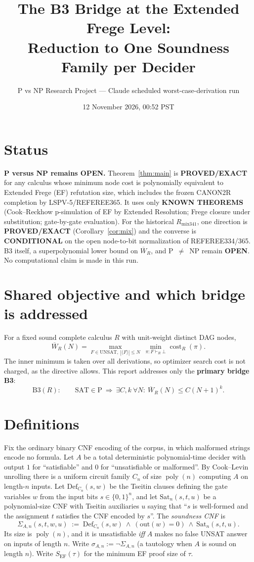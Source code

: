 \documentclass[11pt]{article}
\title{The B3 Bridge at the Extended Frege Level:\\
Reduction to One Soundness Family per Decider}
\author{P vs NP Research Project --- Claude scheduled worst-case-derivation run}
\date{12 November 2026, 00:52 PST}
\newcommand{\SAT}{\mathrm{SAT}}
\newcommand{\UNSAT}{\mathrm{UNSAT}}
\newcommand{\Wbar}{\overline W}
\newcommand{\EF}{\mathrm{EF}}
\newcommand{\poly}{\operatorname{poly}}
\begin{document}
\maketitle

\section*{Status}
\textbf{P versus NP remains OPEN.} Theorem~\ref{thm:main} is
\textbf{PROVED/EXACT} for any calculus whose minimum node cost is polynomially
equivalent to Extended Frege (EF) refutation size, which includes the frozen
CANON2R completion by LSPV-5/REFEREE365. It uses only \textbf{KNOWN THEOREMS}
(Cook--Reckhow p-simulation of EF by Extended Resolution; Frege closure under
substitution; gate-by-gate evaluation). For the historical $R_{\mathrm{mix341}}$,
one direction is \textbf{PROVED/EXACT} (Corollary~\ref{cor:mix}) and the converse is
\textbf{CONDITIONAL} on the open node-to-bit normalization of REFEREE334/365.
B3 itself, a superpolynomial lower bound on $\Wbar_R$, and P~$\neq$~NP remain
\textbf{OPEN}. No computational claim is made in this run.

\section*{Shared objective and which bridge is addressed}
For a fixed sound complete calculus $R$ with unit-weight distinct DAG nodes,
\[
\Wbar_R(N)=\max_{F\in\UNSAT,\ |\langle F\rangle|\le N}\ \min_{\pi:F\vdash_R\bot}\operatorname{cost}_R(\pi).
\]
The inner minimum is taken over all derivations, so optimizer search cost is not
charged, as the directive allows. This report addresses only the
\textbf{primary bridge B3}:
\[
\mathrm{B3}(R):\qquad \SAT\in\mathrm P\ \Longrightarrow\ \exists C,k\ \forall N:\ \Wbar_R(N)\le C(N+1)^k .
\]

\section{Definitions}
Fix the ordinary binary CNF encoding of the corpus, in which malformed strings
encode no formula. Let $A$ be a total deterministic polynomial-time decider with
output $1$ for ``satisfiable'' and $0$ for ``unsatisfiable or malformed''. By
Cook--Levin unrolling there is a uniform circuit family $C_n$ of size $\poly(n)$
computing $A$ on length-$n$ inputs. Let $\mathrm{Def}_{C_n}(s,w)$ be the
Tseitin clauses defining the gate variables $w$ from the input bits
$s\in\{0,1\}^n$, and let $\mathrm{Sat}_n(s,t,u)$ be a polynomial-size CNF with
Tseitin auxiliaries $u$ saying that ``$s$ is well-formed and the assignment $t$
satisfies the CNF encoded by $s$''. The \emph{soundness CNF} is
\[
\Sigma_{A,n}(s,t,w,u)\;:=\;\mathrm{Def}_{C_n}(s,w)\ \wedge\ (\mathrm{out}(w)=0)\ \wedge\ \mathrm{Sat}_n(s,t,u).
\]
Its size is $\poly(n)$, and it is unsatisfiable \emph{iff} $A$ makes no false
UNSAT answer on inputs of length $n$. Write $\sigma_{A,n}:=\neg\Sigma_{A,n}$
(a tautology when $A$ is sound on length $n$).
Write $S_{\EF}(\tau)$ for the minimum EF proof size of $\tau$.
\end{document}

